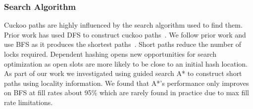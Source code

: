 \subsubsection{Search Algorithm} 

Cuckoo paths are highly influenced by the search algorithm 
used to find them. Prior work has used DFS to construct 
cuckoo paths~\cite{pilaf,memc3}. We follow prior work and 
use BFS as it produces the shortest 
paths~\cite{cuckoo-improvements}. Short paths reduce the 
number of locks required. Dependent hashing opens new 
opportunities for search optimization as open slots are more
likely to be close to an initial hash location. As part of
our work we investigated using guided search A* to construct
short paths using locality information. We found that A*'s
performance only improves on BFS at fill rates about 95\%
which are rarely found in practice due to max fill rate
limitations.



